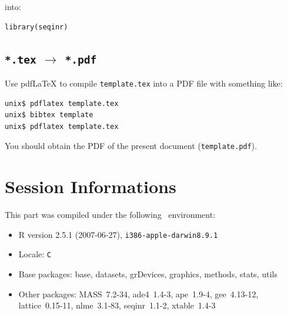 \documentclass{article}
\begin{document}
into:

\begin{verbatim}
library(seqinr)
\end{verbatim}

\subsection{\texttt{*.tex} $\rightarrow$ \texttt{*.pdf}}

Use pdf\LaTeX{} to compile \texttt{template.tex} into a PDF file
with something like:

\begin{verbatim}
unix$ pdflatex template.tex
unix$ bibtex template
unix$ pdflatex template.tex
\end{verbatim}

You should obtain the PDF of the present document (\texttt{template.pdf}).



\section{Session Informations}

This part was compiled under the following \Rlogo{}~environment:

\begin{itemize}
  \item R version 2.5.1 (2007-06-27), \verb|i386-apple-darwin8.9.1|
  \item Locale: \verb|C|
  \item Base packages: base, datasets, grDevices, graphics, methods,
    stats, utils
  \item Other packages: MASS~7.2-34, ade4~1.4-3, ape~1.9-4,
    gee~4.13-12, lattice~0.15-11, nlme~3.1-83, seqinr~1.1-2,
    xtable~1.4-3
\end{itemize}


\clearpage
{}


\end{document}
